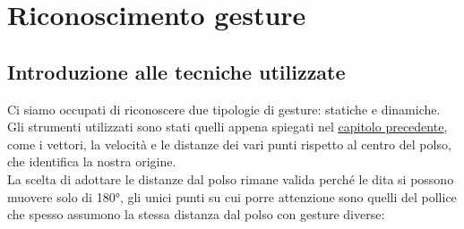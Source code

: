 \chapter{Riconoscimento gesture}

\section{Introduzione alle tecniche utilizzate}

Ci siamo occupati di riconoscere due tipologie di gesture: statiche e dinamiche.\\
Gli strumenti utilizzati sono stati quelli appena spiegati nel \hyperref[chap:metodi]{\underline{capitolo precedente}}, come i vettori, 
la velocità e le distanze dei vari punti rispetto al centro del polso, che identifica la nostra origine.\\
La scelta di adottare le distanze dal polso rimane valida perché le dita si possono muovere solo di 180°, gli unici punti su cui porre attenzione sono quelli del pollice che spesso assumono la stessa distanza dal polso con gesture diverse:


